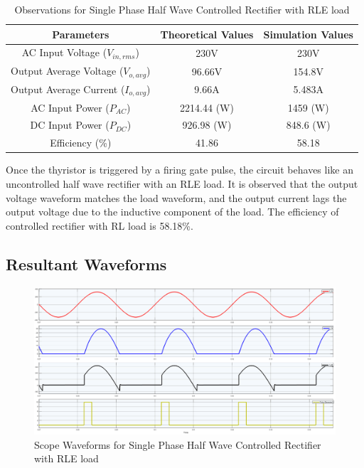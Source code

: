 \begin{table}[h]
    \renewcommand{\arraystretch}{1.3}
    \label{table_observation_7}
    \centering
    \begin{tabular}{|c|c|c|}
        \hline
        Parameters                              & Theoretical Values & Simulation Values \\
        \hline
        \hline
        AC Input Voltage ($ V_{in,rms} $)       & 230V               & 230V              \\
        \hline
        Output Average Voltage ($ V_{o,avg} $)  & 96.66V             & 154.8V            \\
        \hline
        Output Average Current ($ I_{o,avg}  $) & 9.66A              & 5.483A            \\
        \hline
        AC Input Power ($ P_{AC}  $)            & 2214.44 (W)        & 1459 (W)          \\
        \hline
        DC Input Power ($ P_{DC}  $)            & 926.98 (W)         & 848.6 (W)         \\
        \hline
        Efficiency (\%)                         & 41.86              & 58.18             \\
        \hline
    \end{tabular}
    \caption{Observations for Single Phase Half Wave Controlled Rectifier with RLE load}

\end{table}


Once the thyristor is triggered by a firing gate pulse, the circuit behaves like an uncontrolled half wave rectifier with an RLE load. It is observed that the output voltage waveform matches the load waveform, and the output current lags the output voltage due to the inductive component of the load.
The efficiency of controlled rectifier
with RL load is 58.18\%.





\subsection{Resultant Waveforms}

\begin{figure}[h]
    \centering
    \includegraphics[width=1\textwidth]{images/experiment-1/circuit-scope-simulation-07.png}
    \caption{Scope Waveforms for Single Phase Half Wave Controlled Rectifier with RLE load}
    \label{Fig_waveform_single-phase-half-wave-controlled-rectifier-with-RLE-load}
\end{figure}


\pagebreak

